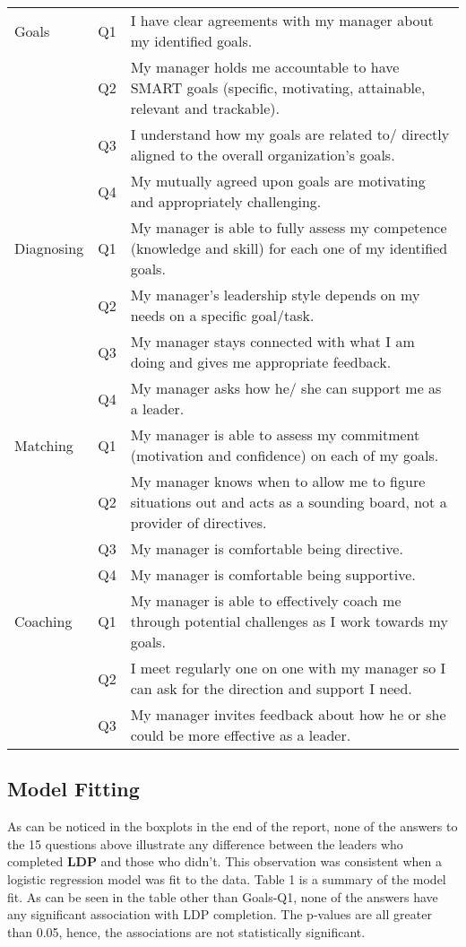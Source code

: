 \documentclass[11pt]{extarticle} %
\begin{document}
\begin{table}[H]
\centering
\begin{tabular}{l|c|p{5in}}
\hline
Goals 		& Q1 & I have clear agreements with my manager about my identified goals. \\
      		& Q2 & My manager holds me accountable to have SMART goals (specific, motivating, attainable, relevant and trackable). \\
      		& Q3 & I understand how my goals are related to/ directly aligned to the overall organization’s goals. \\
		& Q4 & My mutually agreed upon goals are motivating and appropriately challenging. \\
\hline
Diagnosing	& Q1 & My manager is able to fully assess my competence (knowledge and skill) for each one of my identified goals. \\
		& Q2 & My manager’s leadership style depends on my needs on a specific goal/task. \\
		& Q3 & My manager stays connected with what I am doing and gives me appropriate feedback. \\
		& Q4 & My manager asks how he/ she can support me as a leader.\\
\hline
Matching	& Q1 & My manager is able to assess my commitment (motivation and confidence) on each of my goals. \\
		& Q2 & My manager knows when to allow me to figure situations out and acts as a sounding board, not a provider of directives. \\
		& Q3 & My manager is comfortable being directive. \\
		& Q4 & My manager is comfortable being supportive. \\
\hline
Coaching	& Q1 & My manager is able to effectively coach me through potential challenges as I work towards my goals. \\
		& Q2 & I meet regularly one on one with my manager so I can ask for the direction and support I need. \\
		& Q3 & My manager invites feedback about how he or she could be more effective as a leader. \\
\hline
\end{tabular}
\end{table}

\subsection{Model Fitting}
As can be noticed in the boxplots in the end of the report, none of the answers to the 15 questions above illustrate any difference between the leaders who completed {\bf{LDP}} and those who didn't. This observation was consistent when a logistic regression model was fit to the data. Table 1 is a summary of the model fit. As can be seen in the table other than Goals-Q1, none of the answers have any significant association with LDP completion. The p-values are all greater than 0.05, hence, the associations are not statistically significant. 
\end{document}
